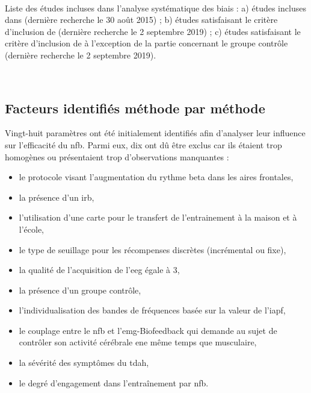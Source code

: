 \newpage\
\begin{table}[h!]
  \centering
  \caption{Liste des études incluses dans l'analyse systématique des biais : a) études incluses dans \citet{Cortese2016}
	(dernière recherche le 30 août 2015) ; b) études satisfaisant le critère d'inclusion de \citet{Cortese2016} (dernière recherche le 2 septembre 2019) ; c) études 
	satisfaisant le critère d'inclusion de \citet{Cortese2016} à l'exception de la partie concernant le groupe contrôle (dernière recherche le 2 septembre 2019).}
  
  \label{Table:table_factors_analysis_meta_analysis_list_studies}
\end{table}

\newpage\
\subsection{Facteurs identifiés méthode par méthode}

Vingt-huit paramètres ont été initialement identifiés afin d'analyser leur influence sur l'efficacité du \gls{nfb}. Parmi eux, dix ont dû être exclus car ils étaient trop
homogènes ou présentaient trop d'observations manquantes : 
\begin{itemize}
	\item le protocole visant l'augmentation du rythme beta dans les aires frontales,
	\item la présence d'un \gls{irb},
  \item l'utilisation d'une carte pour le transfert de l'entrainement à la maison et à l'école, 
  \item le type de seuillage pour les récompenses discrètes (incrémental ou fixe),
  \item la qualité de l'acquisition de l'\gls{eeg} égale à 3,
	\item la présence d'un groupe contrôle,
	\item l'individualisation des bandes de fréquences basée sur la valeur de l'\gls{iapf},
	\item le couplage entre le \gls{nfb} et l'\gls{emg}-Biofeedback qui demande au sujet de contrôler son activité cérébrale ene même temps que musculaire,
	\item la sévérité des symptômes du \gls{tdah},
	\item le degré d'engagement dans l'entraînement par \gls{nfb}.
\end{itemize} 

